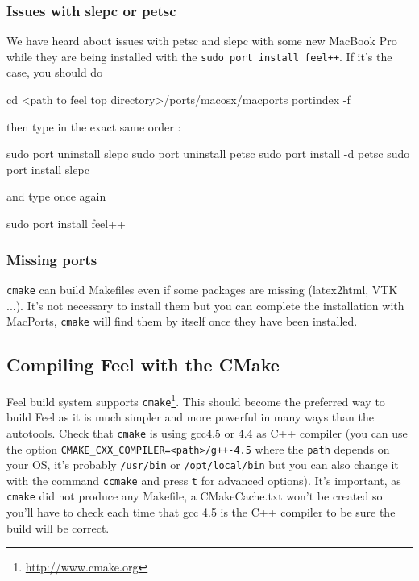 \documentclass[a4paper]{book}
\newcommand{\feel}{Feel\xspace}
\newcommand{\cmake}{\texttt{cmake}\xspace}
\begin{document}
\subsubsection{Issues with slepc or petsc}
We have heard about issues with petsc and slepc with some new MacBook Pro while they are being installed with the \verb|sudo port install feel++|. If it's the case, you should do 
\begin{unixcom}
		cd <path to feel top directory>/ports/macosx/macports
		portindex -f
\end{unixcom}

then type in the exact same order :
\begin{unixcom}
		sudo port uninstall slepc 
		sudo port uninstall petsc
		sudo port install -d petsc
		sudo port install slepc
\end{unixcom}
and type once again
\begin{unixcom}
		sudo port install feel++
\end{unixcom}

\subsubsection{Missing ports}
\cmake can build Makefiles even if some packages are missing (latex2html, VTK ...). It's not necessary to install them but you can complete the installation with MacPorts, \cmake will find them by itself once they have been installed.

\subsection{Compiling Feel with the CMake}

Feel build system supports
\cmake{}\footnote{\url{http://www.cmake.org}}. This should become the
preferred way to build \feel as it is much simpler and more powerful in many
ways than the autotools. Check that \cmake is using gcc4.5 or 4.4 as C++ compiler (you can use the option \verb|CMAKE_CXX_COMPILER=<path>/g++-4.5| where the \verb|path| depends on your OS, it's probably \verb|/usr/bin| or \verb|/opt/local/bin| but you can also change it with the command \verb|ccmake| and press \verb|t| for advanced options). \newline It's important, as \cmake did not produce any Makefile, a CMakeCache.txt won't be created so you'll have to check each time that gcc 4.5 is the C++ compiler to be sure the build will be correct.\newline
\end{document}
